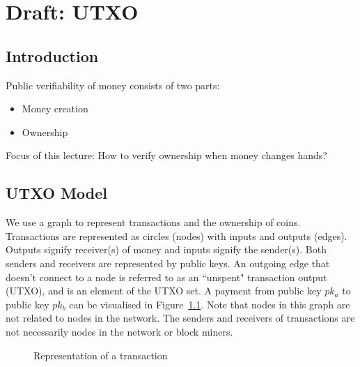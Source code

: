 \chapter{Draft: UTXO}

\section{Introduction}
Public verifiability of money consists of two parts:
\begin{itemize}
    \item Money creation
    \item Ownership
\end{itemize}
Focus of this lecture: How to verify ownership when money changes hands?
\section{UTXO Model}
We use a graph to represent transactions and the ownership of coins.
Transactions are represented as circles (nodes) with inputs and outputs (edges). Outputs signify receiver(s) of money and inputs signify the sender(s). Both senders and receivers are represented by public keys. An outgoing edge that doesn't connect to a node is referred to as an ``unspent" transaction output (UTXO), and is an element of the UTXO set. A payment from public key $pk_a$ to public key $pk_b$ can be visualised in Figure~\ref{fig:tx_model}.
Note that nodes in this graph are not related to nodes in the network. The senders and receivers of transactions are not necessarily nodes in the network or block miners.

\begin{figure}[h]
\begin{center}
\end{center}
\caption{Representation of a transaction}
\label{fig:tx_model}
\end{figure}


